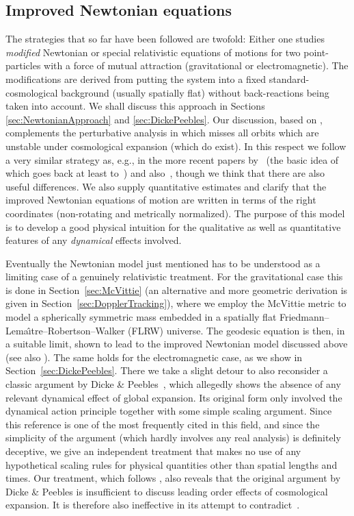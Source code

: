 \documentclass
[rmp,aps,twocolumn,showpacs,preprintnumbers,amsmath,amssymb]{revtex4}
\theoremstyle{plain}
\theoremstyle{definition}
\theoremstyle{remark}
\newcommand{\Lemaitre}{Lema\^{\i}tre}
\begin{document}
\subsection{Improved Newtonian equations}
\label{sec:ImprovedNewtonian}
%
The strategies that so far have been followed are twofold: Either one 
studies \emph{modified} Newtonian or special relativistic equations of 
motions for two point-particles with a force of mutual attraction 
(gravitational or electromagnetic). The modifications are derived from 
putting the system into a fixed standard-cosmological background (usually 
spatially flat) without back-reactions being taken into account. We shall 
discuss this approach in Sections \ref{sec:NewtonianApproach} and 
\ref{sec:DickePeebles}. Our discussion, based on \cite{Carrera.Giulini:2005}, 
complements the perturbative analysis in \cite{Cooperstock.etal:1998} which 
misses all orbits which are unstable under cosmological expansion (which do 
exist). In this respect we follow a very similar strategy as, e.g., in the 
more recent papers by~\cite{Price:2005} (the basic idea of which goes back at 
least to~\cite{Pachner:1963,Pachner:1964}) and also~\cite{Adkins.etal:2007}, 
though we think that there are also useful differences. We also supply 
quantitative estimates and clarify that the improved Newtonian equations 
of motion are written in terms of the right coordinates (non-rotating and 
metrically normalized). The purpose of this model is to develop a good 
physical intuition for the qualitative as well as quantitative features 
of any \emph{dynamical} effects involved. 

Eventually the Newtonian model just mentioned has to be understood as a 
limiting case of a genuinely relativistic treatment. For the gravitational 
case this is done in Section~\ref{sec:McVittie} (an alternative and more 
geometric derivation is given in Section~\ref{sec:DopplerTracking}), where 
we employ the McVittie metric to model a spherically symmetric mass embedded 
in a spatially flat Friedmann--\Lemaitre--Robertson--Walker (FLRW) universe. 
The geodesic equation is then, in a suitable limit, shown to lead to the 
improved Newtonian model discussed above (see also 
\cite{Carrera.Giulini:2005}). The same holds for the electromagnetic case, 
as we show in Section~\ref{sec:DickePeebles}. 
There we take a slight detour to also reconsider a classic argument by 
Dicke \& Peebles~\cite{Dicke.Peebles:1964}, which allegedly shows the 
absence of any relevant dynamical effect of global expansion. Its original 
form only involved the dynamical action principle together with some simple 
scaling argument. Since this reference is one of the most frequently cited 
in this field, and since the simplicity of the argument (which hardly 
involves any real analysis) is definitely deceptive, we give an independent 
treatment that makes no use of any hypothetical scaling rules for physical 
quantities other than spatial lengths and times. Our treatment, which 
follows \cite{Carrera.Giulini:2005}, also reveals that the original argument 
by Dicke \& Peebles is insufficient to discuss leading order effects of 
cosmological expansion. It is therefore also ineffective in its attempt 
to contradict~\cite{Pachner:1963,Pachner:1964}. 
\end{document}

